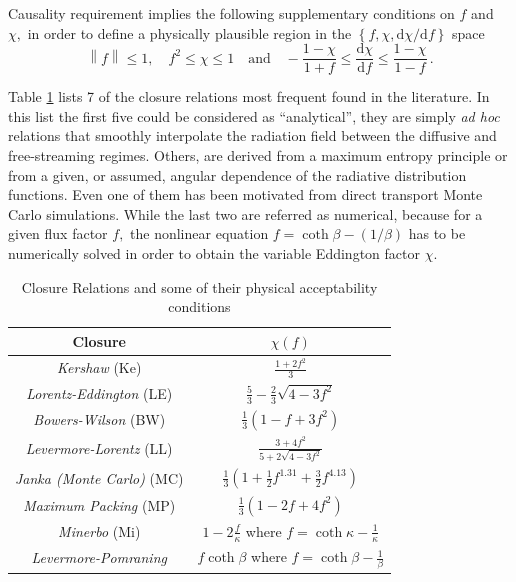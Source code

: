 \documentclass[notitlepage,letterpaper, 10pt]{article}
\begin{document}
Causality requirement implies the following supplementary conditions on $f$ and $\chi,$ in order to define a physically plausible region in the 
$\left\{ f,\chi, \mathrm{d}\chi/{\mathrm{d}f} \right\}  $ space
\cite{PonsIbanezMiralles2000}%
\begin{equation}
\left\|  f\right\|  \leq 1, \quad f^{2}\leq \chi \leq 1 \quad   \text{and} \quad - \frac{1-\chi}{1+f} \leq \frac{\mathrm{d}\chi}{\mathrm{d}f} \leq \frac{1-\chi}{1-f} \, . \label{condfdxi}%
\end{equation}%

Table \ref{tabla1} lists 7 of the closure relations most frequent found in the literature. In this list the first five could be considered as ``analytical'', they are simply \textit{ad hoc} relations that smoothly interpolate the radiation field between the diffusive and free-streaming regimes\cite{LeblancWilson1970,WilsonEtal1975,Kershaw1976}. Others, are derived from a maximum entropy principle or from a given, or assumed, angular dependence of the radiative distribution functions\cite{Minerbo1978,CernohorskyBludman1994}. Even one of them has been motivated from direct transport Monte Carlo simulations. While the last two are referred as numerical, because for a given flux factor $f,$ the nonlinear equation $f=\coth\beta-({1}/{\beta})$ has to be numerically solved in order to obtain the variable Eddington factor $\chi$\cite{Minerbo1978}.    

\begin{table}[ht] \centering
{\small 
\begin{tabular}
[c]{|c|c|}\hline\hline 
\textbf{Closure} & $\chi(f)  $  \\ \hline\hline
\textit{Kershaw } (Ke) \cite{Kershaw1976}   & $\frac{1 + 2 f^2}{3}$ \\ \hline
\textit{Lorentz-Eddington }(LE)    & $\frac{5}{3}-\frac {2}{3}\sqrt{4-3f^{2}}$ \\\hline
\textit{Bowers-Wilson} (BW) \cite{WilsonEtal1975}  & $\frac{1}{3}\left( 1-f+3f^{2}\right)$ \\ \hline
\textit{Levermore-Lorentz} (LL) \cite{Levermore1984}  & $\frac{3 +4f^2 }{5 +2\sqrt{ 4 -3f^2}}$ \\ \hline
\textit{Janka (Monte Carlo) } (MC)  & $\frac{1}{3}\left( 1+\frac{1}{2}f^{1.31} + \frac{3}{2}f^{4.13} \right)  $ \\ \hline 
\textit{Maximum Packing} (MP)      & $\frac{1}{3}\left( 1-2f+4f^{2}\right)  $ \\ \hline 
\textit{Minerbo} (Mi) \cite{Minerbo1978} & $1 -2\frac{f}{\kappa}$   where $f=\coth\kappa -\frac{1}{\kappa}$ \\\hline
\textit{Levermore-Pomraning} & $f\coth\beta $ where $f= \coth\beta- \frac{1}{\beta}$ \\\hline
\end{tabular}
}
\caption{Closure Relations and some of their physical acceptability conditions}
\label{tabla1}
\end{table}
\end{document}
